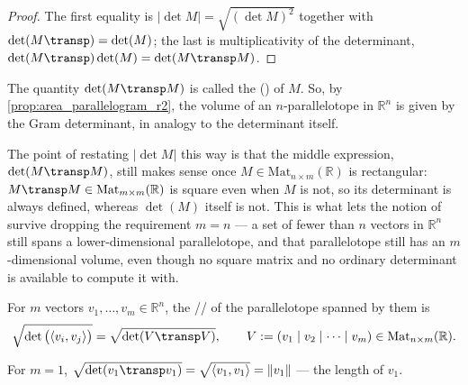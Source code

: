 \begin{proof}
The first equality is $|\det M| = \sqrt{(\det M)^2}$ together with $\det(M\transp)=\det(M)$;
the last is multiplicativity of the determinant, $\det(M\transp)\det(M)=\det(M\transp M)$.
\end{proof}

The quantity $\det(M\transp M)$ is called the 
() of $M$. So, by \cref{prop:area_parallelogram_r2}, the
volume of an $n$-parallelotope in $\mathbb{R}^n$ is given by the Gram determinant, in
analogy to the determinant itself.

\begin{ainote}
The point of restating $|\det M|$ this way is that the middle expression, $\det(M\transp
M)$, still makes sense once $M \in \mathrm{Mat}_{n\times m}(\mathbb{R})$ is rectangular:
$M\transp M \in \mathrm{Mat}_{m\times m}(\mathbb{R})$ is square even when $M$ is not, so its
determinant is always defined, whereas $\det(M)$ itself is not. This is what lets the
notion of  survive dropping the requirement $m=n$ --- a set of
fewer than $n$ vectors in $\mathbb{R}^n$ still spans a lower-dimensional parallelotope, and
that parallelotope still has an $m$-dimensional volume, even though no square matrix and no
ordinary determinant is available to compute it with.
\end{ainote}

\begin{definition}
\label{def:volume_gram_determinant}
For $m$ vectors $v_1,\dots,v_m \in \mathbb{R}^n$, the //
 of the parallelotope spanned by them is
\[\sqrt{\det\big(\langle v_i,v_j\rangle\big)} = \sqrt{\det(V\transp V)},
  \qquad V := (v_1\mid v_2\mid\cdots\mid v_m) \in \mathrm{Mat}_{n\times m}(\mathbb{R}).\]
\end{definition}

\begin{example}
\label{ex:gram_m1_length}
For $m=1$, $\sqrt{\det(v_1\transp v_1)} = \sqrt{\langle v_1,v_1\rangle} = \lVert v_1\rVert$
--- the length of $v_1$.
\end{example}

